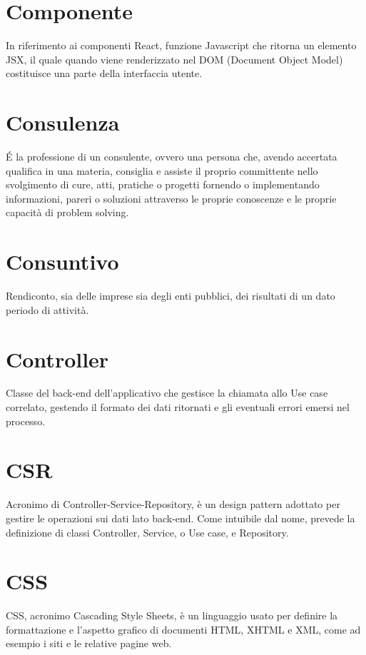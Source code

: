 \section{Componente}\label{sec:Componente}
In riferimento ai componenti React, funzione Javascript che ritorna un elemento JSX, il quale quando viene renderizzato nel DOM (Document Object Model) costituisce una parte della interfaccia utente.

\section{Consulenza}\label{sec:Consulenze}
É la professione di un consulente, ovvero una persona che, avendo accertata qualifica in una materia, consiglia e assiste il proprio committente nello svolgimento di cure, atti, pratiche o progetti fornendo o implementando informazioni, pareri o soluzioni attraverso le proprie conoscenze e le proprie capacità di problem solving.

\section{Consuntivo}\label{sec:Consuntivi}
Rendiconto, sia delle imprese sia degli enti pubblici, dei risultati di un dato periodo di attività.

\section{Controller}\label{sec:Controller}
Classe del back-end dell'applicativo che gestisce la chiamata allo Use case correlato, gestendo il formato dei dati ritornati e gli eventuali errori emersi nel processo.

\section{CSR}\label{sec:Controller-Service-Repository}
Acronimo di Controller-Service-Repository, è un design pattern adottato per gestire le operazioni sui dati lato back-end. Come intuibile dal nome, prevede la definizione di classi Controller, Service, o Use case, e Repository.

\section{CSS}\label{sec:Cascading Style Sheets}
CSS, acronimo Cascading Style Sheets, è un linguaggio usato per definire la formattazione e l'aspetto grafico di documenti HTML, XHTML e XML, come ad esempio i siti e le relative pagine web.